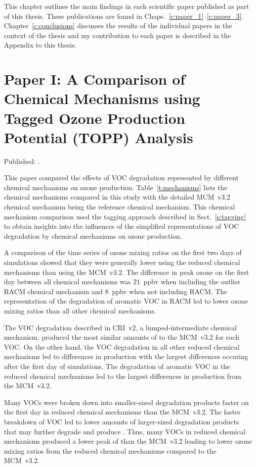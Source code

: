 This chapter outlines the main findings in each scientific paper published as part of this thesis.
These publications are found in Chaps.~\ref{c:paper_1}--\ref{c:paper_3}.
Chapter~\ref{c:conclusions} discusses the results of the individual papers in the context of the thesis and my contribution to each paper is described in the Appendix to this thesis.

\singlespacing
\section{Paper I: A Comparison of Chemical Mechanisms using Tagged Ozone Production Potential (TOPP) Analysis} \label{s:chemical_mechanism_results} 
\onehalfspacing

\noindent
Published: .
\vspace{5mm}

This paper compared the effects of VOC degradation represented by different chemical mechanisms on ozone production.
Table~\ref{t:mechanisms} lists the chemical mechanisms compared in this study with the detailed MCM~v3.2 chemical mechanism being the reference chemical mechanism.
This chemical mechanism comparison used the tagging approach described in Sect.~\ref{s:tagging} to obtain insights into the influences of the simplified representations of VOC degradation by chemical mechanisms on ozone production.

\newpage
A comparison of the time series of ozone mixing ratios on the first two days of simulations showed that they were generally lower using the reduced chemical mechanisms than using the MCM~v3.2.
The difference in peak ozone on the first day between all chemical mechanisms was $21$~ppbv when including the outlier RACM chemical mechanism and $8$~ppbv when not including RACM.
The representation of the degradation of aromatic VOC in RACM led to lower ozone mixing ratios than all other chemical mechanisms.

The VOC degradation described in CRI~v2, a lumped-intermediate chemical mechanism, produced the most similar amounts of  to the MCM~v3.2 for each VOC.
On the other hand, the VOC degradation in all other reduced chemical mechanisms led to differences in  production with the largest differences occuring after the first day of simulations.
The degradation of aromatic VOC in the reduced chemical mechanisms led to the largest differences in  production from the MCM~v3.2.

Many VOCs were broken down into smaller-sized degradation products faster on the first day in reduced chemical mechanisms than the MCM~v3.2.
The faster breakdown of VOC led to lower amounts of larger-sized degradation products that may further degrade and produce .
Thus, many VOCs in reduced chemical mechanisms produced a lower peak of  than the MCM~v3.2 leading to lower ozone mixing ratios from the reduced chemical mechanisms compared to the MCM~v3.2.

